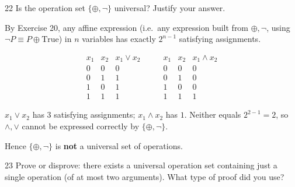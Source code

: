 \begin{exercise}{22}
    Is the operation set $\{\oplus,\neg\}$ universal? Justify your answer.
\end{exercise}
\begin{solbox}

\begin{solution}
By Exercise 20, any affine expression (i.e.\ any expression built from $\oplus,\neg$, using $\neg P\equiv P\oplus\text{True}$) in $n$ variables has exactly $2^{n-1}$ satisfying assignments.

\[
\begin{array}{cc|c}
x_1 & x_2 & x_1\vee x_2\\
\hline
0&0&0\\
0&1&1\\
1&0&1\\
1&1&1
\end{array}
\qquad
\begin{array}{cc|c}
x_1 & x_2 & x_1\wedge x_2\\
\hline
0&0&0\\
0&1&0\\
1&0&0\\
1&1&1
\end{array}
\]

$x_1\vee x_2$ has $3$ satisfying assignments; $x_1\wedge x_2$ has $1$. Neither equals $2^{2-1}=2$, so $\wedge,\vee$ cannot be expressed correctly by $\{\oplus,\neg\}$.

Hence $\{\oplus,\neg\}$ is \textbf{not} a universal set of operations.
\end{solution}
\end{solbox}

\begin{exercise}{23}
    Prove or disprove: there exists a universal operation set containing just a
    single operation (of at most two arguments). What type of proof did you use?
\end{exercise}

